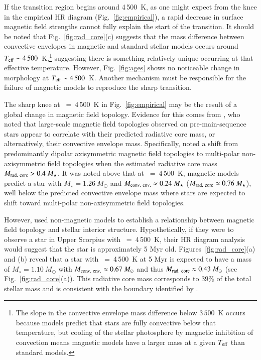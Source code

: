 \documentclass{aa}
\begin{document}
If the transition region begins around 4\,500~K, as one might expect from the knee in the empirical HR diagram (Fig.~\ref{fig:empirical}), a rapid decrease in surface magnetic field strengths cannot fully explain the start of the transition. It should be noted that Fig.~\ref{fig:rad_core}(c) suggests that the mass difference between convective envelopes in magnetic and standard stellar models occurs around $T_{\rm eff} \sim 4\,500$~K,\footnote{The slope in the convective envelope mass difference below $3\,500$~K occurs because models predict that stars are fully convective below that temperature, but cooling of the stellar photosphere by magnetic inhibition of convection means magnetic models have a larger mass at a given $T_{\rm eff}$ than standard models.} suggesting there is something relatively unique occurring at that effective temperature. However, Fig.~\ref{fig:ages} shows no noticeable change in morphology at  $T_{\rm eff} \sim 4\,500$~K. Another mechanism must be responsible for the failure of magnetic models to reproduce the sharp transition.

The sharp knee at \teff~=~4\,500~K in Fig.~\ref{fig:empirical} may be the result of a global change in magnetic field topology. Evidence for this comes from \citet{Gregory2012}, who noted that large-scale magnetic field topologies observed on pre-main-sequence stars appear to correlate with their predicted radiative core mass, or alternatively, their convective envelope mass. Specifically, \citet{Gregory2012} noted a shift from predominantly dipolar axisymmetric magnetic field topologies to multi-polar non-axisymmetric field topologies when the estimated radiative core mass $M_{\rm rad.\ core} > 0.4\ M_\star$. It was noted above that at \teff~=~4\,500~K, magnetic models predict a star with $M_{\star} = 1.26\ M_{\odot}$ and $M_{\rm conv.\ env.} \approx 0.24\ M_{\star}$ ($M_{\rm rad.\ core} \approx 0.76\ M_{\star}$), well below the predicted convective envelope mass where stars are expected to shift toward multi-polar non-axisymmetric field topologies.

However, \citet{Gregory2012} used non-magnetic models \citep{Siess2000} to establish a relationship between magnetic field topology and stellar interior structure. Hypothetically, if they were to observe a star in Upper Scorpius with \teff~=~4\,500~K, their HR diagram analysis would suggest that the star is approximately 5 Myr old. Figures~\ref{fig:rad_core}(a) and (b) reveal that a star with \teff~=~4\,500~K at 5 Myr is expected to have a mass of $M_{\star} = 1.10\ M_{\odot}$ with $M_{\rm conv.\ env.} \approx 0.67\ M_{\odot}$ and thus $M_{\rm rad.\ core} \approx 0.43\ M_{\odot}$ (see Fig.~\ref{fig:rad_core}(a)). This radiative core mass corresponds to 39\% of the total stellar mass and is consistent with the boundary identified by \citet{Gregory2012}.
\end{document}
